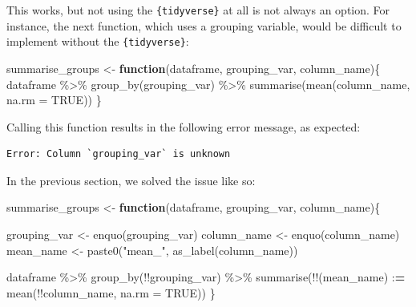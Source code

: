 \documentclass[
]{article}
\newenvironment{Shaded}{\begin{snugshade}}{\end{snugshade}}
\newcommand{\AttributeTok}[1]{\textcolor[rgb]{0.77,0.63,0.00}{#1}}
\newcommand{\ConstantTok}[1]{\textcolor[rgb]{0.00,0.00,0.00}{#1}}
\newcommand{\ControlFlowTok}[1]{\textcolor[rgb]{0.13,0.29,0.53}{\textbf{#1}}}
\newcommand{\ErrorTok}[1]{\textcolor[rgb]{0.64,0.00,0.00}{\textbf{#1}}}
\newcommand{\FunctionTok}[1]{\textcolor[rgb]{0.00,0.00,0.00}{#1}}
\newcommand{\NormalTok}[1]{#1}
\newcommand{\OtherTok}[1]{\textcolor[rgb]{0.56,0.35,0.01}{#1}}
\newcommand{\SpecialCharTok}[1]{\textcolor[rgb]{0.00,0.00,0.00}{#1}}
\newcommand{\StringTok}[1]{\textcolor[rgb]{0.31,0.60,0.02}{#1}}
\begin{document}
This works, but not using the \texttt{\{tidyverse\}} at all is not always an option. For instance,
the next function, which uses a grouping variable, would be difficult to implement without the
\texttt{\{tidyverse\}}:

\begin{Shaded}
\begin{Highlighting}[]
\NormalTok{summarise\_groups }\OtherTok{\textless{}{-}} \ControlFlowTok{function}\NormalTok{(dataframe, grouping\_var, column\_name)\{}
\NormalTok{  dataframe }\SpecialCharTok{\%\textgreater{}\%}
    \FunctionTok{group\_by}\NormalTok{(grouping\_var) }\SpecialCharTok{\%\textgreater{}\%}  
    \FunctionTok{summarise}\NormalTok{(}\FunctionTok{mean}\NormalTok{(column\_name, }\AttributeTok{na.rm =} \ConstantTok{TRUE}\NormalTok{))}
\NormalTok{\}}
\end{Highlighting}
\end{Shaded}

Calling this function results in the following error message, as expected:

\begin{verbatim}
Error: Column `grouping_var` is unknown
\end{verbatim}

In the previous section, we solved the issue like so:

\begin{Shaded}
\begin{Highlighting}[]
\NormalTok{summarise\_groups }\OtherTok{\textless{}{-}} \ControlFlowTok{function}\NormalTok{(dataframe, grouping\_var, column\_name)\{}

\NormalTok{  grouping\_var }\OtherTok{\textless{}{-}} \FunctionTok{enquo}\NormalTok{(grouping\_var)}
\NormalTok{  column\_name }\OtherTok{\textless{}{-}} \FunctionTok{enquo}\NormalTok{(column\_name)}
\NormalTok{  mean\_name }\OtherTok{\textless{}{-}} \FunctionTok{paste0}\NormalTok{(}\StringTok{"mean\_"}\NormalTok{, }\FunctionTok{as\_label}\NormalTok{(column\_name))}

\NormalTok{  dataframe }\SpecialCharTok{\%\textgreater{}\%}
    \FunctionTok{group\_by}\NormalTok{(}\SpecialCharTok{!!}\NormalTok{grouping\_var) }\SpecialCharTok{\%\textgreater{}\%}  
    \FunctionTok{summarise}\NormalTok{(}\SpecialCharTok{!!}\NormalTok{(mean\_name) }\SpecialCharTok{:}\ErrorTok{=} \FunctionTok{mean}\NormalTok{(}\SpecialCharTok{!!}\NormalTok{column\_name, }\AttributeTok{na.rm =} \ConstantTok{TRUE}\NormalTok{))}
\NormalTok{\}}
\end{Highlighting}
\end{Shaded}
\end{document}
